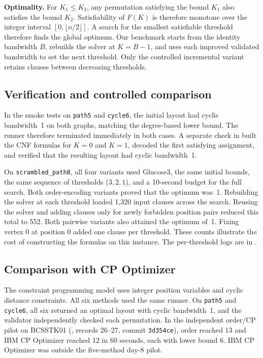 \textbf{Optimality.} For $K_1\le K_2$, any permutation satisfying the
bound $K_1$ also satisfies the bound $K_2$. Satisfiability of $F(K)$ is
therefore monotone over the integer interval $[0,\lfloor n/2\rfloor]$.
A search for the smallest satisfiable threshold therefore finds the global
optimum. Our benchmark starts from the identity bandwidth $B$, rebuilds
the solver at $K=B-1$, and uses each improved validated bandwidth to set
the next threshold. Only the controlled incremental variant retains clauses
between decreasing thresholds.

\subsection{Verification and controlled comparison}
In the smoke tests on \texttt{path5} and \texttt{cycle6}, the initial
layout had cyclic bandwidth~1 on both graphs, matching the degree-based
lower bound. The runner therefore terminated immediately in both cases.
A separate check in  built the CNF formulas
for $K=0$ and $K=1$, decoded the first satisfying assignment, and verified
that the resulting layout had cyclic bandwidth~1.

On \texttt{scrambled\_path8}, all four variants used Glucose3, the same
initial bounds, the same sequence of thresholds ($3,2,1$), and a
10-second budget for the full search. Both order-encoding variants proved
that the optimum was~1. Rebuilding the solver at each threshold loaded
1,320 input clauses across the search. Reusing the solver and adding
clauses only for newly forbidden position pairs reduced this total to
552. Both pairwise variants also attained the optimum of~1. Fixing vertex
$0$ at position $0$ added one clause per threshold. These counts
illustrate the cost of constructing the formulas on this instance.
The per-threshold logs are in .

\subsection{Comparison with CP Optimizer}
The constraint programming model uses integer position variables and
cyclic distance constraints. All six methods used the same runner. On
\texttt{path5} and \texttt{cycle6}, all six returned an optimal layout
with cyclic bandwidth~1, and the validator independently checked each
permutation. In the independent order/CP pilot on BCSSTK01
(, records 26--27, commit \texttt{3d354ce}),
order reached 13 and IBM CP Optimizer reached 12 in 60 seconds, each with
lower bound 6. IBM CP Optimizer was outside the five-method day-8 pilot.
